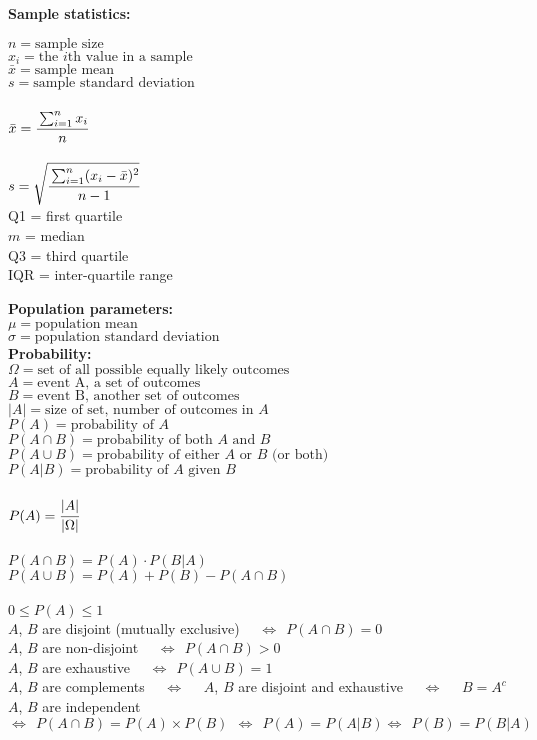 \documentclass[12pt,letterpaper]{article}
\begin{document}
{\bf Sample statistics:}\vspace{-10pt}
\begin{multicols}{2}\noindent 
$n=\text{sample size} $\\
$x_i=\text{the $i$th value in a sample} $\\
$\bar x = \text{sample mean}$\\
$s = \text{sample standard deviation}$\\\\
$\bar x = \cfrac{\sum_{i=1}^n x_i}{n}$\\\\
$s = \sqrt{\cfrac{\sum_{i=1}^n (x_i-\bar x)^2}{n-1}}$ \\

\columnbreak \noindent
Q1 = first quartile\\
$m$ = median\\
Q3 = third quartile\\
IQR = inter-quartile range\\
\end{multicols}

{\bf Population parameters:}\\
$\mu = \text{population mean}$\\
$\sigma = \text{population standard deviation}$\\

{\bf Probability:}\\
$\Omega = \text{set of all possible equally likely outcomes}$\\
$A = \text{event A, a set of outcomes}$\\
$B = \text{event B, another set of outcomes}$\\
$|A| = \text{size of set, number of outcomes in } A$\\
$P(A) = \text{probability of }A$\\
$P(A \cap B) = \text{probability of both $A$ and $B$}$\\
$P(A \cup B) = \text{probability of either $A$ or $B$ (or both)}$\\
$P(A | B) = \text{probability of $A$ given $B$}$\\\\
$P(A) = \cfrac{|A|}{|\Omega|}$\\\\
$P(A \cap B) = P(A) \cdot P(B|A)$\\
$P(A \cup B) = P(A) + P(B) - P(A\cap B)$\\
\\
$0 \le P(A) \le 1$\\
$A$, $B$ are disjoint (mutually exclusive) ~~$\iff~~P(A\cap B) = 0$\\
$A$, $B$ are non-disjoint ~~$\iff~~P(A\cap B) > 0$\\
$A$, $B$ are exhaustive ~~$\iff~~P(A\cup B) = 1$\\
$A$, $B$ are complements ~~$\iff$~~ $A$, $B$ are disjoint and exhaustive ~~$\iff$~~ $B=A^c$\\
$A$, $B$ are independent ~~$\iff~~P(A\cap B) = P(A)\times P(B) ~~\iff~~ P(A)=P(A|B) \iff~~ P(B)=P(B|A) $\\
\end{document}
